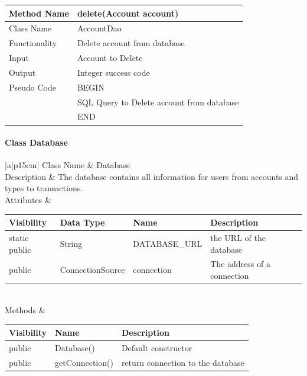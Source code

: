 \documentclass[12pt]{article}
\begin{document}
\begin{tabular}{ |p{3cm}||p{\colWidth}|  }
	\hline
	Method Name &  delete(Account account)\\
	\hline
	Class Name & AccountDao\\
	\hline
	Functionality & Delete account from database\\
	\hline
	Input & Account to Delete\\
	\hline
	Output & Integer success code\\
	\hline
	Pseudo Code &BEGIN\\& SQL Query to Delete account from database\\&END\\
	\hline
\end{tabular}

\paragraph{Class Database}
\begin{table}[H]
	\begin{tabular}{|a|p{15cm}|}
		\hline
		{Class Name} & {Database} \\
		\hline
		Description & The database contains all information for users from accounts and types to transactions.\\
		\hline
		Attributes & 
		\begin{tabular}{| p{2cm} | p{3.5cm} | p{4.5cm} | p{3.45cm} |}
			\hline
			\rowcolor{lightgray}
			Visibility & Data Type & Name & Description \\
			\hline
			\rowcolor{white}
			static public & String & DATABASE\_URL & the URL of the database\\
			\hline
			public & ConnectionSource & connection & The address of a connection \\
			\hline		
		\end{tabular} \\
		\hline
		Methods & 		 
		\begin{tabular}{| p{2cm} | p{5cm} | p{6.9cm} |}
			\hline
			\rowcolor{gray}
			{Visibility} &{Name} & {Description} \\
			\hline
			\rowcolor{white}			
			public & Database() & Default constructor\\
			\hline
			public &  getConnection() & return connection to the database\\
			\hline	
		\end{tabular}								 
	\end{tabular}
\end{table}
\end{document}

